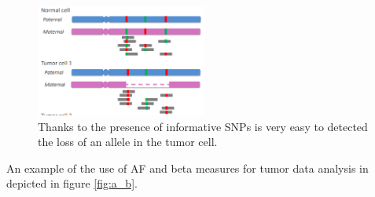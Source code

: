 \begin{figure}[H]
	\centering
	\includegraphics[width=0.5\textwidth]{af_properties.png}
	\caption{ Thanks to the presence of informative SNPs is very easy to detected the loss of an allele in the tumor cell.}
	\label{fig:af_properties}
\end{figure}

An example of the use of AF and beta measures for tumor data analysis in depicted in figure \ref{fig:a_b}.


